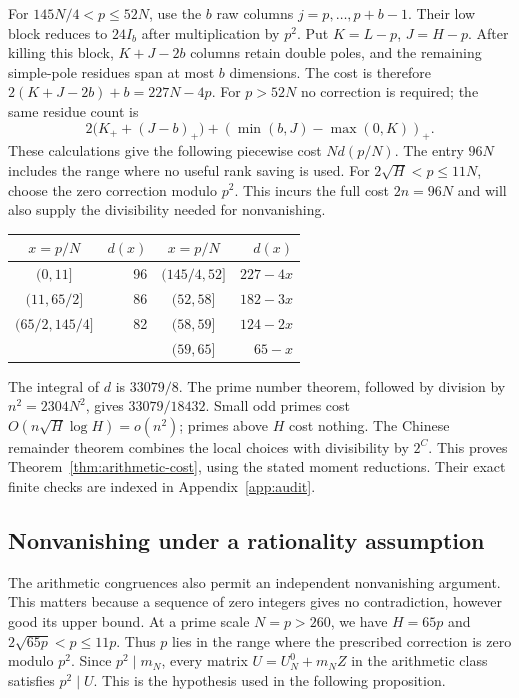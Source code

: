 For $145N/4<p\le52N$, use the $b$ raw columns
$j=p,\ldots,p+b-1$. Their low block reduces to $24I_b$ after
multiplication by $p^2$. Put $K=L-p$, $J=H-p$. After killing this
block, $K+J-2b$ columns retain double poles, and the remaining
simple-pole residues span at most $b$ dimensions. The cost is therefore
$2(K+J-2b)+b=227N-4p$. For $p>52N$ no correction is required;
the same residue count is
\[
 2\bigl(K_++(J-b)_+\bigr)
 +(\min(b,J)-\max(0,K))_+.
\]
These calculations give the following piecewise cost $Nd(p/N)$.
The entry $96N$ includes the range where no useful rank saving is used.
For $2\sqrt H<p\le11N$, choose the zero correction modulo $p^2$.
This incurs the full cost $2n=96N$ and will also supply the divisibility
needed for nonvanishing.
\begin{center}
\begin{tabular}{c r@{\qquad}c r}
\toprule
$x=p/N$&$d(x)$&$x=p/N$&$d(x)$\\
\midrule
$(0,11]$&96&$(145/4,52]$&$227-4x$\\
$(11,65/2]$&86&$(52,58]$&$182-3x$\\
$(65/2,145/4]$&82&$(58,59]$&$124-2x$\\
&&$(59,65]$&$65-x$\\
\bottomrule
\end{tabular}
\end{center}
The integral of $d$ is $33079/8$. The prime number theorem, followed by
division by $n^2=2304N^2$, gives $33079/18432$. Small odd primes cost
$O(n\sqrt H\log H)=o(n^2)$; primes above $H$ cost nothing. The Chinese
remainder theorem combines the local choices with divisibility by
$2^C$. This proves Theorem~\ref{thm:arithmetic-cost}, using the stated
moment reductions. Their exact finite checks are indexed in
Appendix~\ref{app:audit}.

\subsection{Nonvanishing under a rationality assumption}

The arithmetic congruences also permit an independent nonvanishing
argument. This matters because a sequence of zero integers gives no
contradiction, however good its upper bound.
At a prime scale $N=p>260$, we have $H=65p$ and
$2\sqrt{65p}<p\le11p$. Thus $p$ lies in the range where the prescribed
correction is zero modulo $p^2$. Since $p^2\mid m_N$, every matrix
$U=U_N^0+m_NZ$ in the arithmetic class satisfies $p^2\mid U$.
This is the hypothesis used in the following proposition.

